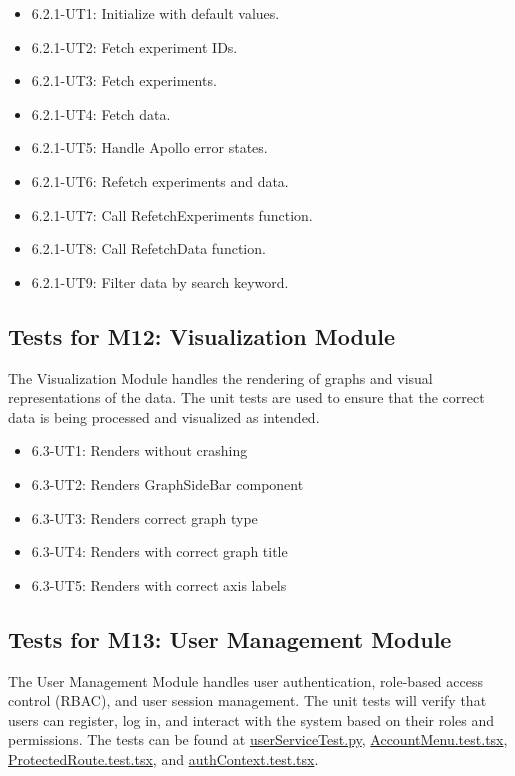 \documentclass[12pt, titlepage]{article}
\begin{document}
\begin{itemize}
  \item 6.2.1-UT1: Initialize with default values.
  \item 6.2.1-UT2: Fetch experiment IDs.
  \item 6.2.1-UT3: Fetch experiments.
  \item 6.2.1-UT4: Fetch data.
  \item 6.2.1-UT5: Handle Apollo error states.
  \item 6.2.1-UT6: Refetch experiments and data.
  \item 6.2.1-UT7: Call RefetchExperiments function.
  \item 6.2.1-UT8: Call RefetchData function.
  \item 6.2.1-UT9: Filter data by search keyword.
\end{itemize}

\subsection{Tests for M12: Visualization Module}

The Visualization Module handles the rendering of graphs and visual
representations of the data. The unit tests are used to ensure that the correct
data is being processed and visualized as intended.

\begin{itemize}
  \item 6.3-UT1: Renders without crashing
  \item 6.3-UT2: Renders GraphSideBar component
  \item 6.3-UT3: Renders correct graph type
  \item 6.3-UT4: Renders with correct graph title
  \item 6.3-UT5: Renders with correct axis labels
\end{itemize}

\subsection{Tests for M13: User Management Module}

The User Management Module handles user authentication, role-based access
control (RBAC), and user session management. The unit tests will verify that
users can register, log in, and interact with the system based on their roles
and permissions. The tests can be found at
\href{https://github.com/SumanyaG/Alkalytics/blob/main/src/backend/test/userServiceTest.py}{userServiceTest.py},
\href{https://github.com/SumanyaG/Alkalytics/blob/main/src/frontend/test/components/auth/AccountMenu.test.tsx}{AccountMenu.test.tsx},
\href{https://github.com/SumanyaG/Alkalytics/blob/main/src/frontend/test/components/auth/ProtectedRoute.test.tsx}{ProtectedRoute.test.tsx},
and
\href{https://github.com/SumanyaG/Alkalytics/blob/main/src/frontend/test/context/authContext.test.tsx}{authContext.test.tsx}.
\end{document}
